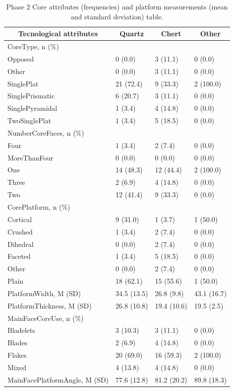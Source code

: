 \documentclass[12pt,twoside]{reedthesis}
\begin{document}
\begin{longtable}[t]{llll}
\caption{\label{tab:unnamed-chunk-59}Phase 2 Core attributes (frequencies) and platform measurements (mean and standard deviation) table.}\\
\toprule
\multicolumn{1}{c}{\textbf{Tecnological attributes}} & \multicolumn{1}{c}{\textbf{Quartz}} & \multicolumn{1}{c}{\textbf{Chert}} & \multicolumn{1}{c}{\textbf{Other}}\\
\midrule
CoreType, n (\%) &  &  & \\
Opposed & 0 (0.0) & 3 (11.1) & 0 (0.0)\\
Other & 0 (0.0) & 3 (11.1) & 0 (0.0)\\
SinglePlat & 21 (72.4) & 9 (33.3) & 2 (100.0)\\
SinglePrismatic & 6 (20.7) & 3 (11.1) & 0 (0.0)\\
\addlinespace
SinglePyramidal & 1 (3.4) & 4 (14.8) & 0 (0.0)\\
TwoSinglePlat & 1 (3.4) & 5 (18.5) & 0 (0.0)\\
NumberCoreFaces, n (\%) &  &  & \\
Four & 1 (3.4) & 2 (7.4) & 0 (0.0)\\
MoreThanFour & 0 (0.0) & 0 (0.0) & 0 (0.0)\\
\addlinespace
One & 14 (48.3) & 12 (44.4) & 2 (100.0)\\
Three & 2 (6.9) & 4 (14.8) & 0 (0.0)\\
Two & 12 (41.4) & 9 (33.3) & 0 (0.0)\\
CorePlatform, n (\%) &  &  & \\
Cortical & 9 (31.0) & 1 (3.7) & 1 (50.0)\\
\addlinespace
Crushed & 1 (3.4) & 2 (7.4) & 0 (0.0)\\
Dihedral & 0 (0.0) & 2 (7.4) & 0 (0.0)\\
Faceted & 1 (3.4) & 5 (18.5) & 0 (0.0)\\
Other & 0 (0.0) & 2 (7.4) & 0 (0.0)\\
Plain & 18 (62.1) & 15 (55.6) & 1 (50.0)\\
\addlinespace
PlatformWidth, M (SD) & 34.5 (13.5) & 26.8 (9.8) & 43.1 (16.7)\\
PlatformThickness, M (SD) & 26.8 (10.8) & 19.4 (10.6) & 19.5 (2.5)\\
MainFaceCoreUse, n (\%) &  &  & \\
Bladelets & 3 (10.3) & 3 (11.1) & 0 (0.0)\\
Blades & 2 (6.9) & 4 (14.8) & 0 (0.0)\\
\addlinespace
Flakes & 20 (69.0) & 16 (59.3) & 2 (100.0)\\
Mixed & 4 (13.8) & 4 (14.8) & 0 (0.0)\\
MainFacePlatformAngle, M (SD) & 77.6 (12.8) & 81.2 (20.2) & 89.8 (18.3)\\
\bottomrule
\end{longtable}
\end{document}
